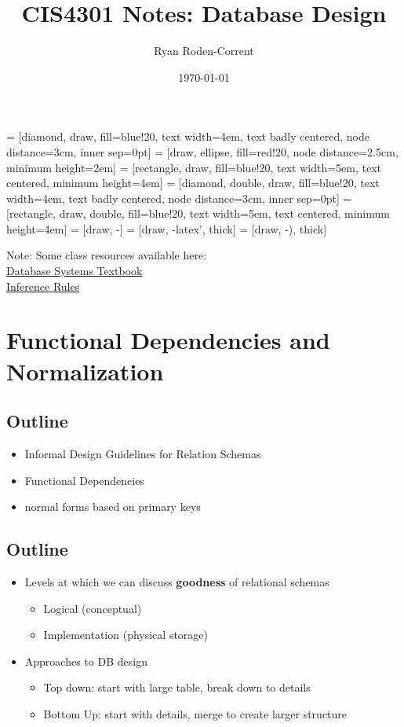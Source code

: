 \documentclass[12pt]{article}
\title{CIS4301 Notes: Database Design}
\author{Ryan Roden-Corrent}
\date{\today}
\begin{document}
\setlength\parindent{0pt}
 = [diamond, draw, fill=blue!20, text width=4em,
  text badly centered, node distance=3cm, inner sep=0pt]
 = [draw, ellipse, fill=red!20, node distance=2.5cm,
  minimum height=2em]
 = [rectangle, draw, fill=blue!20, text width=5em,
  text centered, minimum height=4em]
 = [diamond, double, draw, fill=blue!20, text width=4em,
  text badly centered, node distance=3cm, inner sep=0pt]
 = [rectangle, draw, double, fill=blue!20, text width=5em,
  text centered, minimum height=4em]
 = [draw, -]
 = [draw, -latex', thick]
 = [draw, -), thick]
\maketitle

Note: Some class resources available here:\\
\href{http://cise.ufl.edu/class/cis4301sp14/slides/fd.pdf}{Database Systems
  Textbook}\\
\href{http://cise.ufl.edu/class/cis4301sp14/slides/inference_rules.jpg}{Inference
  Rules}\\
\section{Functional Dependencies and Normalization}
\subsection{Outline}
\begin{itemize}
  \item Informal Design Guidelines for Relation Schemas
  \item Functional Dependencies
  \item normal forms based on primary keys
\end{itemize}

\subsection{Outline}
\begin{itemize}
  \item {
      Levels at which we can discuss \textbf{goodness} of relational schemas
      \begin{itemize}
        \item Logical (conceptual)
        \item Implementation (physical storage)
      \end{itemize}
    }
  \item {
      Approaches to DB design
      \begin{itemize}
        \item Top down: start with large table, break down to details
        \item Bottom Up: start with details, merge to create larger structure
      \end{itemize}
    }
\end{itemize}
\end{document}
